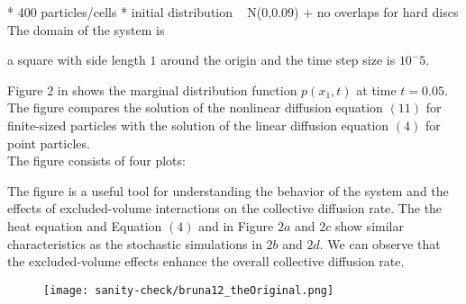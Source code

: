 * 400 particles/cells 
* initial distribution ~ N(0,0.09) + no overlaps for hard discs 
The domain of the system is 

a square with side length $1$ around the origin
and the time step size is $10^-5$. 

Figure $2$ in \cite{Bruna2012} shows the marginal distribution function $p(x_1, t)$ at time $t = 0.05$. 
The figure compares the solution of the nonlinear diffusion equation $(11)$ for finite-sized particles with the solution of the linear diffusion equation $(4)$ for point particles. \\
The figure consists of four plots:

The figure is a useful tool for understanding the behavior of the system and the effects of excluded-volume interactions on the collective diffusion rate.
The the heat equation and Equation $(4)$ and in Figure $2a$ and $2c$ show similar characteristics as the stochastic simulations in $2b$ and $2d$. 
We can observe that the excluded-volume effects enhance the overall collective diffusion rate.




\begin{figure}[]
	\centering
    \texttt{[image: sanity-check/bruna12\_theOriginal.png]}
\end{figure}

